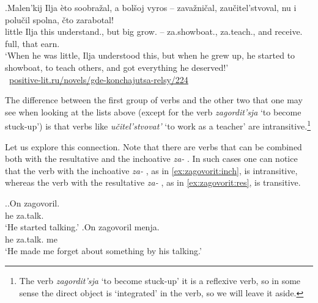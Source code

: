 \exg.\label{ex:zateach}Malen'kij Ilja \`{e}to soobra\v{z}al, a bol\v{s}oj vyros -- zava\v{z}ni\v{c}al, zau\v{c}itel'stvoval, {nu i} polu\v{c}il spolna, \v{c}to zarabotal!\\
little Ilja this understand., but big grow. -- za.showboat., za.teach., {and} receive. full, that earn.\\
\trans `When he was little, Ilja understood this, but when he grew up, he started to showboat, to teach others, and got everything he deserved!'\\\hbox{}\hfill\hbox{
\url{positive-lit.ru/novels/gde-konchajutsa-relsy/224}}

The difference between the first group of verbs and the other two that one may see when looking at the lists above (except for the verb \textit{zagordit'sja} `to become stuck-up') is that verbs like \textit{u\v{c}itel'stvovat'} `to work as a teacher' are intransitive.\footnote{The verb \textit{zagordit'sja} `to become stuck-up' it is a reflexive verb, so in some sense the direct object is `integrated' in the verb, so we will leave it aside.}

Let us explore this connection. Note that there are verbs that can be combined both with the resultative  and the inchoative  \textit{za-}  . In such cases one can notice that the verb with the inchoative  \textit{za-}  , as in \ref{ex:zagovorit:inch}, is intransitive, whereas the verb with the resultative  \textit{za-}  , as in \ref{ex:zagovorit:res}, is transitive.

\ex.\ag.\label{ex:zagovorit:inch}On zagovoril.\\
he za.talk.\\
\trans `He started talking.'
\bg.\label{ex:zagovorit:res}On zagovoril menja.\\
he za.talk. me\\
\trans `He made me forget about something by his talking.'
 
